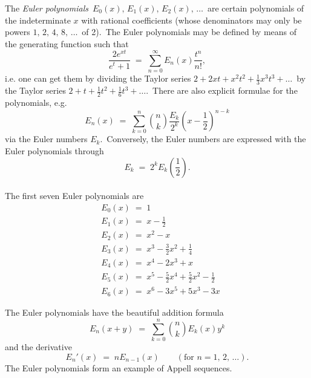 \documentclass[12pt]{article}
\theoremstyle{definition}
\begin{document}
The \emph{Euler polynomials}\, $E_0(x),\,E_1(x),\,E_2(x),\,\ldots$\, are certain polynomials of the indeterminate $x$ with rational coefficients (whose denominators may only be powers $1,\,2,\,4,\,8,\,\ldots$\, of 2).\, The Euler polynomials may be defined by means of the generating function such that
$$\frac{2e^{xt}}{e^t\!+\!1} \;=\; \sum_{n=0}^\infty E_n(x)\frac{t^n}{n!},$$
i.e. one can get them by dividing the Taylor series $2+2xt+x^2t^2+\frac{1}{3}x^3t^3+\ldots$\, by the Taylor series $2+t+\frac{1}{2}t^2+\frac{1}{6}t^3+\ldots$.\, There are also explicit formulae for the polynomials, e.g.
$$E_n(x) \;=\; \sum_{k=0}^n {n \choose k}\frac{E_k}{2^k}\left(x\!-\!\frac{1}{2}\right)^{n-k}$$
via the Euler numbers $E_k$.\, Conversely, the Euler numbers are expressed with the Euler polynomials through
$$E_k \;=\; 2^kE_k\!\!\left(\!\frac{1}{2}\!\right).$$\\
The first seven Euler polynomials are
\begin{align*}
    & E_0(x) \;=\; 1\\
    & E_1(x) \;=\; x\!-\!\frac{1}{2}\\
    & E_2(x) \;=\; x^2\!-\!x\\
    & E_3(x) \;=\; x^3\!-\!\frac{3}{2}x^2\!+\!\frac{1}{4}\\
    & E_4(x) \;=\; x^4\!-\!2x^3\!+\!x\\
    & E_5(x) \;=\; x^5\!-\!\frac{5}{2}x^4\!+\!\frac{5}{2}x^2\!-\!\frac{1}{2}\\
    & E_6(x) \;=\; x^6\!-\!3x^5\!+\!5x^3\!-\!3x
\end{align*}

The Euler polynomials have the beautiful addition formula
$$E_n(x\!+\!y) \;=\; \sum_{k=0}^n{n \choose k}E_k(x)y^k$$
and the derivative
$$E_n'(x) \;=\; nE_{n-1}(x) \qquad (\textrm{for  } n = 1,\,2,\,\ldots).$$
The Euler polynomials form an example of Appell sequences.


\end{document}
